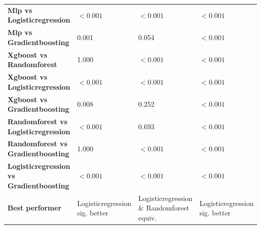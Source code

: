 \begin{table}[H]
{\begin{tabular}{llll}
        \textbf{Mlp vs Logisticregression} & $< 0.001$ & $< 0.001$ & $< 0.001$ \\
        \textbf{Mlp vs Gradientboosting} & 0.001 & 0.054 & $< 0.001$ \\
        \textbf{Xgboost vs Randomforest} & 1.000 & $< 0.001$ & $< 0.001$ \\
        \textbf{Xgboost vs Logisticregression} & $< 0.001$ & $< 0.001$ & $< 0.001$ \\
        \textbf{Xgboost vs Gradientboosting} & 0.008 & 0.252 & $< 0.001$ \\
        \textbf{Randomforest vs Logisticregression} & $< 0.001$ & 0.693 & $< 0.001$ \\
        \textbf{Randomforest vs Gradientboosting} & 1.000 & $< 0.001$ & $< 0.001$ \\
        \textbf{Logisticregression vs Gradientboosting} & $< 0.001$ & $< 0.001$ & $< 0.001$ \\
        \textbf{Best performer} & Logisticregression sig. better & Logisticregression \& Randomforest equiv. & Logisticregression sig. better \\
        \bottomrule
    \end{tabular}}
\end{table}
